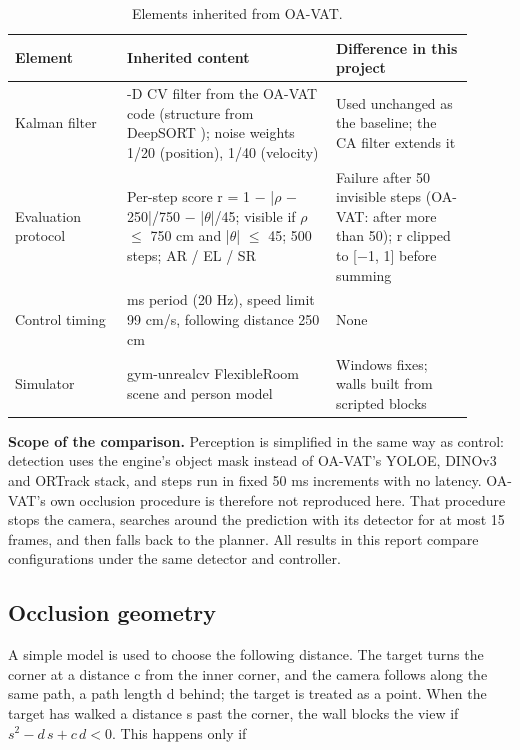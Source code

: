 \documentclass[12pt,a4paper]{article}
\begin{document}
\begin{table}[htbp]
  \centering
  \small
  \caption{Elements inherited from OA-VAT.}
  \renewcommand{\arraystretch}{1.15}
  \begin{tabular}{>{\raggedright\arraybackslash}p{0.223\linewidth}>{\raggedright\arraybackslash}p{0.416\linewidth}>{\raggedright\arraybackslash}p{0.271\linewidth}}
  \toprule
  \textbf{Element} & \textbf{Inherited content} & \textbf{Difference in this project} \\
  \midrule
  Kalman filter & 8-D CV filter from the OA-VAT code (structure from DeepSORT \cite{r20}); noise weights 1/20 (position), 1/40 (velocity) & Used unchanged as the baseline; the CA filter extends it \\
  Evaluation protocol & Per-step score r = 1 $-$ |$\rho$ $-$ 250|/750 $-$ |$\theta$|/45; visible if $\rho$ $\le$ 750 cm and |$\theta$| $\le$ 45\textdegree{}; 500 steps; AR / EL / SR & Failure after 50 invisible steps (OA-VAT: after more than 50); r clipped to [$-$1, 1] before summing \\
  Control timing & 50 ms period (20 Hz), speed limit 99 cm/s, following distance 250 cm & None \\
  Simulator & gym-unrealcv FlexibleRoom scene and person model & Windows fixes; walls built from scripted blocks \\
  \bottomrule
  \end{tabular}
\end{table}

\textbf{Scope of the comparison.} Perception is simplified in the same way as control: detection uses the engine’s object mask instead of OA-VAT’s YOLOE, DINOv3 and ORTrack stack, and steps run in fixed 50 ms increments with no latency. OA-VAT’s own occlusion procedure is therefore not reproduced here. That procedure stops the camera, searches around the prediction with its detector for at most 15 frames, and then falls back to the planner. All results in this report compare configurations under the same detector and controller.


\subsection{Occlusion geometry}
A simple model is used to choose the following distance. The target turns the corner at a distance c from the inner corner, and the camera follows along the same path, a path length d behind; the target is treated as a point. When the target has walked a distance s past the corner, the wall blocks the view if $s^2 - d\,s + c\,d < 0$. This happens only if
\end{document}
